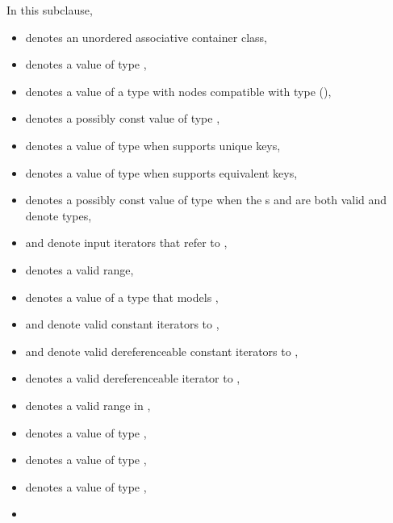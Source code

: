 \pnum
{}%
%
%
%
%
%
In this subclause,
\begin{itemize}
\item
{} denotes an unordered associative container class,
\item
{} denotes a value of type ,
\item
{} denotes a value of a type with nodes compatible
  with type  (),
\item
{} denotes a possibly const value of type ,
\item
{} denotes a value of type 
  when  supports unique keys,
\item
{} denotes a value of type 
  when  supports equivalent keys,
\item
{} denotes a possibly const value of type 
  when the s
   and
  are both valid and denote types,
\item
{} and  denote input iterators
  that refer to ,
\item
\tcode{[i, j)} denotes a valid range,
\item
{} denotes a value of a type 
that models ,
\item
{} and  denote valid constant iterators to ,
\item
{} and  denote
  valid dereferenceable constant iterators to ,
\item
{} denotes a valid dereferenceable iterator to ,
\item
\tcode{[q1, q2)} denotes a valid range in ,
\item
{} denotes a value of type ,
\item
{} denotes a value of type ,
\item
{} denotes a value of type ,
\item

\end{itemize}

